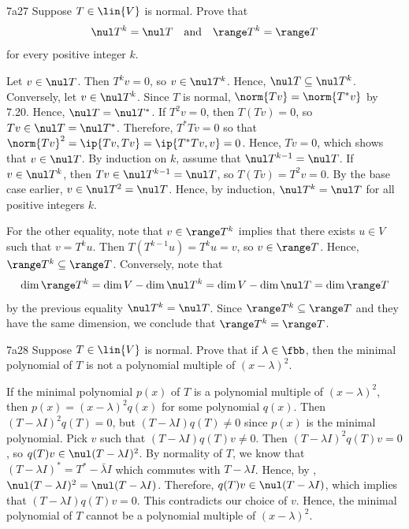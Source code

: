 \begin{exercise}{7a27}
    Suppose $T \in \lin{V}$ is normal.
    Prove that
    \[
        \nul T^k = \nul T \quad \text{and} \quad \range T^k = \range T
    \]
    for every positive integer $k$.
\end{exercise}

\begin{sol}
    Let $v \in \nul T$.
    Then $T^k v = 0$, so $v \in \nul T^k$.
    Hence, $\nul T \subseteq \nul T^k$.
    Conversely, let $v \in \nul T^k$.
    Since $T$ is normal, $\norm{Tv} = \norm{T^\ast v}$ by 7.20.
    Hence, $\nul T = \nul T^\ast$.
    If $T^2 v = 0$, then $T(Tv) = 0$, so $Tv \in \nul T = \nul T^\ast$.
    Therefore, $T^\ast Tv = 0$ so that $\norm{Tv}^2 = \ip{Tv, Tv} = \ip{T^\ast Tv, v} = 0$.
    Hence, $Tv = 0$, which shows that $v \in \nul T$.
    By induction on $k$, assume that $\nul T^{k-1} = \nul T$.
    If $v \in \nul T^k$, then $T v \in \nul T^{k-1} = \nul T$, so $T(Tv) = T^2 v = 0$.
    By the base case earlier, $v \in \nul T^2 = \nul T$.
    Hence, by induction, $\nul T^k = \nul T$ for all positive integers $k$.

    For the other equality, note that $v \in \range T^k$ implies that there exists $u \in V$ such that $v = T^k u$.
    Then $T(T^{k-1} u) = T^k u = v$, so $v \in \range T$.
    Hence, $\range T^k \subseteq \range T$.
    Conversely, note that
    \[
        \dim \range T^k = \dim V - \dim \nul T^k = \dim V - \dim \nul T = \dim \range T
    \]
    by the previous equality $\nul T^k = \nul T$.
    Since $\range T^k \subseteq \range T$ and they have the same dimension, we conclude that $\range T^k = \range T$.
\end{sol}

\begin{exercise}{7a28}
    Suppose $T \in \lin{V}$ is normal.
    Prove that if $\lambda \in \fbb$, then the minimal polynomial of $T$ is not a polynomial multiple of $(x - \lambda)^2$.
\end{exercise}

\begin{sol}
    If the minimal polynomial $p(x)$ of $T$ is a polynomial multiple of $(x - \lambda)^2$, then $p(x) = (x - \lambda)^2 q(x)$ for some polynomial $q(x)$.
    Then $(T - \lambda I)^2 q(T) = 0$, but $(T - \lambda I) q(T) \neq 0$ since $p(x)$ is the minimal polynomial.
    Pick $v$ such that $(T - \lambda I) q(T) v \neq 0$.
    Then $(T - \lambda I)^2 q(T) v = 0$, so $q(T) v \in \nul (T - \lambda I)^2$.
    By normality of $T$, we know that $(T - \lambda I)^\ast = T^\ast - \bar\lambda I$ which commutes with $T - \lambda I$.
    Hence, by , $\nul (T - \lambda I)^2 = \nul (T - \lambda I)$.
    Therefore, $q(T) v \in \nul (T - \lambda I)$, which implies that $(T - \lambda I) q(T) v = 0$.
    This contradicts our choice of $v$.
    Hence, the minimal polynomial of $T$ cannot be a polynomial multiple of $(x - \lambda)^2$.
\end{sol}

